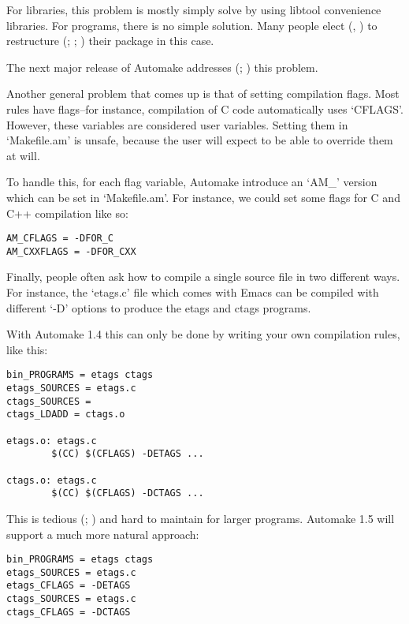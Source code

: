 For libraries, this problem is mostly simply solve by using libtool 
convenience libraries. For programs, there is no simple solution. Many people 
elect ({\McQ{}}, {\MbQ{}}) to restructure ({\MbQ{}}; {\McQ{}}; {\McQ{}}) their package in this case.

The next major release of Automake addresses ({\MaQ{}}; {\MbQ{}}) this problem. 


Another general problem that comes up is that of setting compilation flags. Most rules have flags--for instance, compilation of C code automatically uses `CFLAGS'. However, these variables are considered user variables. Setting them in `Makefile.am' is unsafe, because the user will expect to be able to override them at will. 


To handle this, for each flag variable, Automake introduce an `AM\_{}' version which can be set in `Makefile.am'. For instance, we could set some flags for C and C++ compilation like so: 

\begin{Verbatim}[frame=single]
AM_CFLAGS = -DFOR_C
AM_CXXFLAGS = -DFOR_CXX
\end{Verbatim}



 Finally, people often ask how to compile a single source file in two different ways. For instance, the `etags.c' file which comes with Emacs can be compiled with different `-D' options to produce the etags and ctags programs. 


With Automake 1.4 this can only be done by writing your own compilation rules, like this: 

\begin{Verbatim}[frame=single]
bin_PROGRAMS = etags ctags
etags_SOURCES = etags.c
ctags_SOURCES =
ctags_LDADD = ctags.o

etags.o: etags.c
        $(CC) $(CFLAGS) -DETAGS ...

ctags.o: etags.c
        $(CC) $(CFLAGS) -DCTAGS ...
\end{Verbatim}



This is tedious ({\MdQ{}}; {\MaQ{}}) and hard to maintain for 
larger programs. Automake 1.5 will support a much more natural approach: 

\begin{Verbatim}[frame=single]
bin_PROGRAMS = etags ctags
etags_SOURCES = etags.c
etags_CFLAGS = -DETAGS
ctags_SOURCES = etags.c
ctags_CFLAGS = -DCTAGS
\end{Verbatim}


